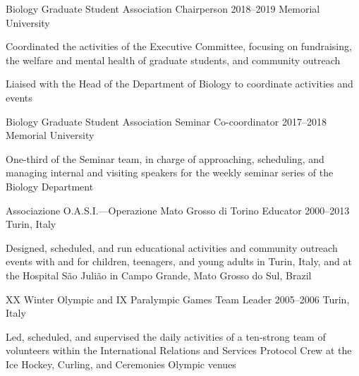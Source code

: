 \begin{cventries}
  \cventry
    {Biology Graduate Student Association} %
    {Chairperson} %
    {2018--2019} %
    {Memorial University} %
    {
      \begin{cvitems} %
        \item {Coordinated the activities of the Executive Committee, focusing on fundraising, the welfare and mental health of graduate students, and community outreach}
        \item {Liaised with the Head of the Department of Biology to coordinate activities and events}
      \end{cvitems}
    }

  \cventry
    {Biology Graduate Student Association} %
    {Seminar Co-coordinator} %
    {2017--2018} %
    {Memorial University} %
    {
      \begin{cvitems} %
        \item {One-third of the Seminar team, in charge of approaching, scheduling, and managing internal and visiting speakers for the weekly seminar series of the Biology Department}
      \end{cvitems}
    }

  \cventry
    {Associazione O.A.S.I.---Operazione Mato Grosso di Torino} %
    {Educator} %
    {2000--2013} %
    {Turin, Italy} %
    {
      \begin{cvitems} %
        \item {Designed, scheduled, and run educational activities and community outreach events with and for children, teenagers, and young adults in Turin, Italy, and at the Hospital S{\~a}o Juli{\~a}o in Campo Grande, Mato Grosso do Sul, Brazil}
      \end{cvitems}
    }

\cventry
    {XX Winter Olympic and IX Paralympic Games} %
    {Team Leader} %
    {2005--2006} %
    {Turin, Italy} %
    {
      \begin{cvitems} %
        \item {Led, scheduled, and supervised the daily activities of a ten-strong team of volunteers within the International Relations and Services Protocol Crew at the Ice Hockey, Curling, and Ceremonies Olympic venues}
      \end{cvitems}
    }

\end{cventries}
